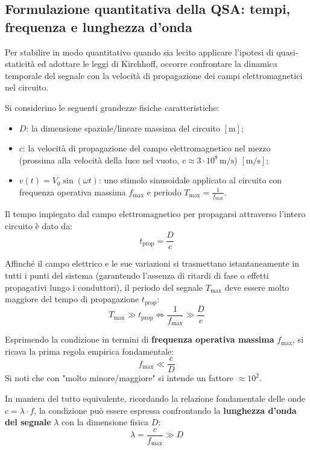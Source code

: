 \documentclass[12pt, a4paper]{report}
\begin{document}
\subsection{Formulazione quantitativa della QSA: tempi, frequenza e lunghezza d'onda}
Per stabilire in modo quantitativo quando sia lecito applicare l'ipotesi di quasi-staticità ed adottare le leggi di Kirchhoff, occorre confrontare la dinamica temporale del segnale con la velocità di propagazione dei campi elettromagnetici nel circuito.

Si considerino le seguenti grandezze fisiche caratteristiche:
\begin{itemize}
    \item $D$: la dimensione spaziale/lineare massima del circuito $[\mathrm{m}]$;
    \item $c$: la velocità di propagazione del campo elettromagnetico nel mezzo (prossima alla velocità della luce nel vuoto, $c \approx 3 \cdot 10^8\,\mathrm{m/s}$) $[\mathrm{m/s}]$;
    \item $v(t) = V_0 \sin(\omega t)$: uno stimolo sinusoidale applicato al circuito con frequenza operativa massima $f_{\text{max}}$ e periodo $T_{\text{max}} = \frac{1}{f_{\text{max}}}$.
\end{itemize}

Il tempo impiegato dal campo elettromagnetico per propagarsi attraverso l'intero circuito è dato da:
\begin{equation}
    t_{\text{prop}} = \frac{D}{c}
\end{equation}

Affinché il campo elettrico e le sue variazioni si trasmettano istantaneamente in tutti i punti del sistema (garantendo l'assenza di ritardi di fase o effetti propagativi lungo i conduttori), il periodo del segnale $T_{\text{max}}$ deve essere molto maggiore del tempo di propagazione $t_{\text{prop}}$:
\begin{equation}
    T_{\text{max}} \gg t_{\text{prop}} \iff \frac{1}{f_{\text{max}}} \gg \frac{D}{c}
\end{equation}

Esprimendo la condizione in termini di \textbf{frequenza operativa massima} $f_{\text{max}}$, si ricava la prima regola empirica fondamentale:
\begin{equation}
    f_{\text{max}} \ll \frac{c}{D}
\end{equation}
Si noti che con "molto minore/maggiore" si intende un fattore $\approx 10^2$.

In maniera del tutto equivalente, ricordando la relazione fondamentale delle onde $c = \lambda \cdot f$, la condizione può essere espressa confrontando la \textbf{lunghezza d'onda del segnale} $\lambda$ con la dimensione fisica $D$:
\begin{equation}
    \lambda = \frac{c}{f_{\text{max}}} \gg D
\end{equation}
\end{document}
